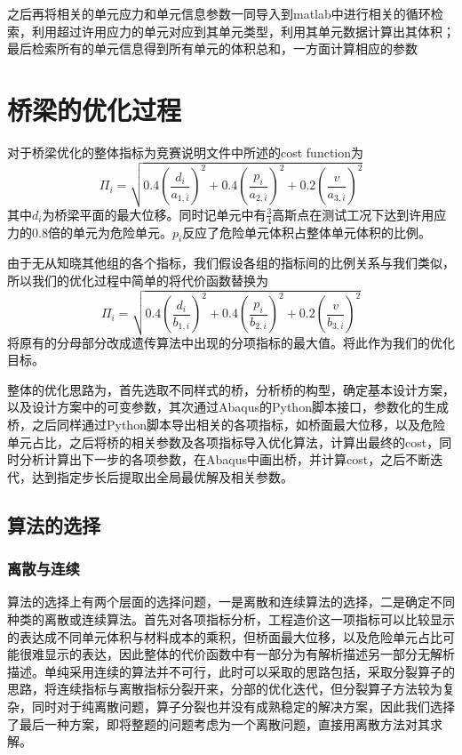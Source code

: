 \documentclass[forprint]{WHUBachelor}
\begin{document}
之后再将相关的单元应力和单元信息参数一同导入到matlab中进行相关的循环检索，利用超过许用应力的单元对应到其单元类型，利用其单元数据计算出其体积；最后检索所有的单元信息得到所有单元的体积总和，一方面计算相应的参数

\chapter{桥梁的优化过程}
对于桥梁优化的整体指标为竞赛说明文件中所述的cost function为
\begin {equation} 
\Pi_{i}=\sqrt{0.4\left(\frac{d_{i}}{a_{1, i}}\right)^{2}+0.4\left(\frac{p_{i}}{a_{2, i}}\right)^{2}+0.2\left(\frac{v}{a_{3, i}}\right)^{2}}
 \end {equation}
其中$d_i$为桥梁平面的最大位移。同时记单元中有$\frac{3}{4}$高斯点在测试工况下达到许用应力的0.8倍的单元为危险单元。$p_i$反应了危险单元体积占整体单元体积的比例。\par
由于无从知晓其他组的各个指标，我们假设各组的指标间的比例关系与我们类似，所以我们的优化过程中简单的将代价函数替换为
\begin {equation} 
\Pi_{i}=\sqrt{0.4\left(\frac{d_{i}}{b_{1, i}}\right)^{2}+0.4\left(\frac{p_{i}}{b_{2, i}}\right)^{2}+0.2\left(\frac{v}{b_{3, i}}\right)^{2}}
 \end {equation}
将原有的分母部分改成遗传算法中出现的分项指标的最大值。将此作为我们的优化目标。\par
整体的优化思路为，首先选取不同样式的桥，分析桥的构型，确定基本设计方案，以及设计方案中的可变参数，其次通过Abaqus的Python脚本接口，参数化的生成桥，之后同样通过Python脚本导出相关的各项指标，如桥面最大位移，以及危险单元占比，之后将桥的相关参数及各项指标导入优化算法，计算出最终的cost，同时分析计算出下一步的各项参数，在Abaqus中画出桥，并计算cost，之后不断迭代，达到指定步长后提取出全局最优解及相关参数。
\section{算法的选择}
\subsection{离散与连续}
算法的选择上有两个层面的选择问题，一是离散和连续算法的选择，二是确定不同种类的离散或连续算法。首先对各项指标分析，工程造价这一项指标可以比较显示的表达成不同单元体积与材料成本的乘积，但桥面最大位移，以及危险单元占比可能很难显示的表达，因此整体的代价函数中有一部分为有解析描述另一部分无解析描述。单纯采用连续的算法并不可行，此时可以采取的思路包括，采取分裂算子的思路，将连续指标与离散指标分裂开来，分部的优化迭代，但分裂算子方法较为复杂，同时对于纯离散问题，算子分裂也并没有成熟稳定的解决方案，因此我们选择了最后一种方案，即将整题的问题考虑为一个离散问题，直接用离散方法对其求解。\par
\end{document}
